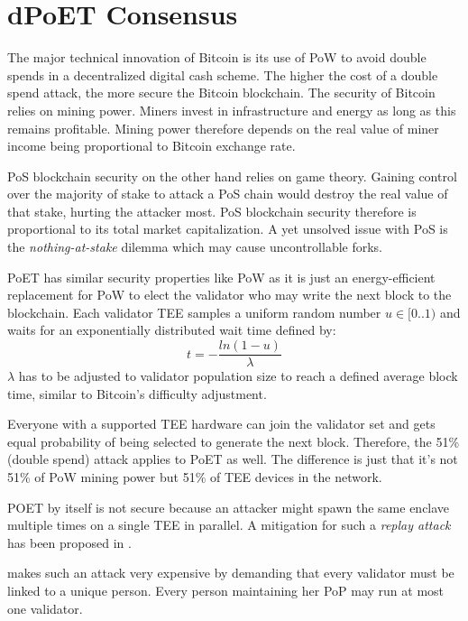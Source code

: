 \documentclass[conference]{IEEEtran}
\begin{document}
\section{dPoET Consensus}
The major technical innovation of Bitcoin is its use of PoW to avoid double spends in a decentralized digital cash scheme. The higher the cost of a double spend attack, the more secure the Bitcoin blockchain.
The security of Bitcoin relies on mining power. Miners invest in infrastructure and energy as long as this remains profitable. Mining power therefore depends on the real value of miner income being proportional to Bitcoin exchange rate. 

PoS blockchain security on the other hand relies on game theory. Gaining control over the majority of stake to attack a PoS chain would destroy the real value of that stake, hurting the attacker most. PoS blockchain security therefore is proportional to its total market capitalization. A yet unsolved issue with PoS is the \textit{nothing-at-stake} dilemma \cite{poelstra15} which may cause uncontrollable forks.

PoET has similar security properties like PoW as it is just an energy-efficient replacement for PoW to elect the validator who may write the next block to the blockchain. Each validator TEE samples a uniform random number $u \in [0..1)$ and waits for an exponentially distributed wait time defined by:
\begin{equation}
	t = -\frac{ln(1-u)}{\lambda}
\end{equation}
$\lambda$ has to be adjusted to validator population size to reach a defined average block time, similar to Bitcoin's difficulty adjustment.

Everyone with a supported TEE hardware can join the validator set and gets equal probability of being selected to generate the next block. 
Therefore, the 51\% (double spend) attack applies to PoET as well. The difference is just that it's not 51\% of PoW mining power but 51\% of TEE devices in the network.   

POET by itself is not secure because an attacker might spawn the same enclave multiple times on a single TEE in parallel. A mitigation for such a \emph{replay attack} has been proposed in \cite{rote}.

\encointer makes such an attack very expensive by demanding that every validator must be linked to a unique person. Every person maintaining her PoP may run at most one validator.
\end{document}
